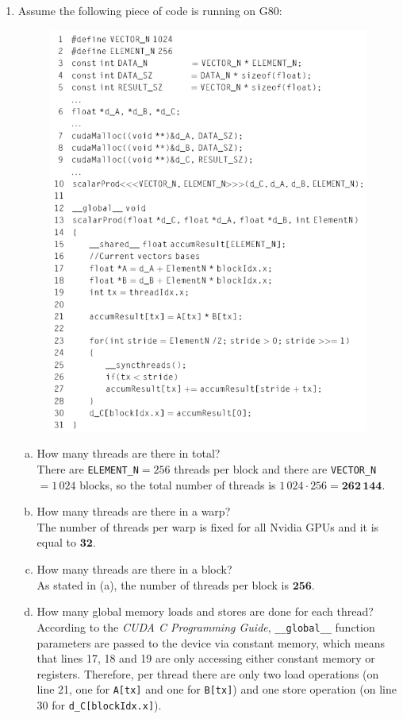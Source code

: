 \documentclass{article}
\begin{document}
\begin{enumerate}[1.]
    \item Assume the following piece of code is running on G80:
	\begin{figure}[ht]
		\centering
            \includegraphics[width=0.75\linewidth]{Code.PNG}
		\label{code}
	\end{figure}
	\begin{enumerate}[(a)]
	    \item How many threads are there in total?\\
	    There are \texttt{ELEMENT\_N}$=256$ threads per block and there are \texttt{VECTOR\_N}$=1\,024$ blocks, so the total number of threads is $1\,024 \cdot 256 = \mathbf{262\,144}$.
	    \item How many threads are there in a warp?\\
	    The number of threads per warp is fixed for all Nvidia GPUs and it is equal to $\mathbf{32}$.
	    \item How many threads are there in a block?\\
	    As stated in (a), the number of threads per block is $\mathbf{256}$.
	    \item How many global memory loads and stores are done for each thread?\\
	    According to the \emph{CUDA C Programming Guide}, \texttt{\_\_global\_\_} function parameters are passed to the device via constant memory, which means that lines 17, 18 and 19 are only accessing either constant memory or registers. Therefore, per thread there are only two load operations (on line 21, one for \texttt{A[tx]} and one for \texttt{B[tx]}) and one store operation (on line 30 for \texttt{d\_C[blockIdx.x]}).

\end{enumerate}
\end{enumerate}
\end{document}
